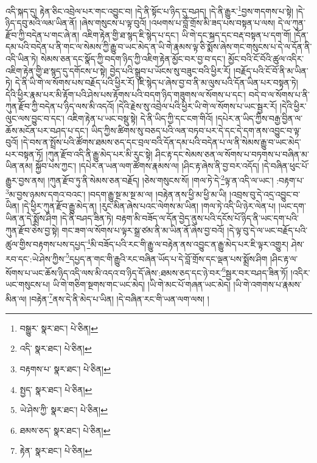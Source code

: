འདི་སྐད་དུ། རྟེན་ཅིང་འབྲེལ་པར་གང་འབྱུང་བ། །དེ་ནི་སྟོང་པ་ཉིད་དུ་བཤད། །དེ་ནི་རྒྱུར་\footnote{བསྒྱུར་  སྣར་ཐང་།  པེ་ཅིན། }བྱས་གདགས་པ་སྟེ། །དེ་ཉིད་དབུ་མའི་ལམ་ཡིན་ནོ། །ཞེས་གསུངས་པ་ལྟ་བུའོ། །འཕགས་པ་བློ་གྲོས་མི་ཟད་པས་བསྟན་པ་ལས། དེ་ལ་ཀུན་རྫོབ་ཀྱི་བདེན་པ་གང་ཞེ་ན། འཇིག་རྟེན་གྱི་ཐ་སྙད་ཇི་སྙེད་པ་དང་། ཡི་གེ་དང་སྐད་དང་བརྡ་བསྟན་པ་དག་གོ། །དོན་དམ་པའི་བདེན་པ་ནི་གང་ལ་སེམས་ཀྱི་རྒྱུ་བ་ཡང་མེད་ན་ཡི་གེ་རྣམས་ལྟ་ཅི་སྨོས་ཞེས་གང་གསུངས་པ་དེ་ལ་དོན་ནི་འདི་ཡིན་ཏེ། སེམས་ཅན་དང་སྣོད་ཀྱི་བདག་ཉིད་ཀྱི་འཇིག་རྟེན་མྱོང་བར་བྱ་བ་དང་། མྱོང་བའི་ངོ་བོའི་ཚུལ་འདིར་འཇིག་རྟེན་གྱི་ཐ་སྙད་དུ་དགོངས་པ་སྟེ། བྱེད་པའི་སྒྲུབ་པ་ཡོངས་སུ་བཟུང་བའི་ཕྱིར་རོ། །བརྗོད་པའི་ངོ་བོ་ནི་མ་ཡིན་ཏེ། དེ་ནི་ཡི་གེ་ལ་སོགས་པས་བརྗོད་པའི་ཕྱིར་རོ། །ཇི་སྙེད་པ་ཞེས་བྱ་བ་ནི་མ་ལུས་པའི་དོན་ཡིན་པར་བསྟན་ཏེ། དེའི་ཕྱིར་རྣམ་པར་མི་རྟོག་པའི་ཤེས་པས་རྟོགས་པའི་བདག་ཉིད་གཟུགས་ལ་སོགས་པ་དང་། བདེ་བ་ལ་སོགས་པ་ནི་ཀུན་རྫོབ་ཀྱི་བདེན་པ་ཉིད་ལས་མི་འདའོ། །དེའི་རྗེས་སུ་འབྲེལ་པའི་ཕྱིར་ཡི་གེ་ལ་སོགས་པ་ཡང་སྦྱར་རོ། །དེའི་ཕྱིར་ལུང་ལས་བྱུང་བ་དང་། འཇིག་རྟེན་པ་ཡང་བསྡུ་སྟེ། དེ་ནི་ཡིད་ཀྱི་དང་ངག་གིའོ། །དཔེར་ན་ཡིད་ཀྱིས་བརྒྱ་བྱིན་ལ་ཆོས་མངོན་པར་བཤད་པ་དང་། ཡིད་ཀྱིས་ཚིགས་སུ་བཅད་པའི་ལན་བཏབ་པར་དེ་དང་དེ་དག་ནས་འབྱུང་བ་ལྟ་བུའོ། །དེ་བས་ན་སྤྲོས་པའི་ཚོགས་ཐམས་ཅད་དང་བྲལ་བའི་དོན་དམ་པའི་བདེན་པ་ལ་ནི་སེམས་རྒྱུ་བ་ཡང་མེད་པར་བསྟན་ཏོ། །ཀུན་རྫོབ་འདི་ནི་རྒྱུ་མེད་པར་མི་རུང་སྟེ། ཤིང་རྟ་དང་སེམས་ཅན་ལ་སོགས་པ་བཏགས་པ་བཞིན་མ་ཡིན་ནམ། སྐྱོབ་པས་ཀྱང་། །དཔེར་ན་ཡན་ལག་ཚོགས་རྣམས་ལ། །ཤིང་རྟ་ཞེས་ནི་བྱ་བར་འདོད། །དེ་བཞིན་ཕུང་པོ་རྒྱུར་བྱས་ནས། །ཀུན་རྫོབ་ཏུ་ནི་སེམས་ཅན་བརྗོད། །ཅེས་གསུངས་སོ། །གལ་ཏེ་དེ་\footnote{འདི་  སྣར་ཐང་།  པེ་ཅིན། }ལྟ་ན་འདི་ལ་ཡང་། :བརྟག་པ་\footnote{བརྟགས་པ་  སྣར་ཐང་།  པེ་ཅིན། }མ་བྱས་ཉམས་དགའ་བའང་། །བདག་རྒྱུ་སྔ་མ་སྔ་མ་ལ། །བརྟེན་ནས་ཕྱི་མ་ཕྱི་མ་ཡི། །འབྲས་བུ་དེ་འདྲ་འབྱུང་བ་ཡིན། །དེ་ཕྱིར་ཀུན་རྫོབ་རྒྱུ་མེད་ན། །རུང་མིན་ཞེས་པའང་ལེགས་མ་ཡིན། །གལ་ཏེ་འདི་ཡི་ཉེར་ལེན་པ། །ཡང་དག་ཡིན་ན་དེ་སྨྲོས་ཤིག །དེ་ནི་བཤད་ཟིན་ཏེ། བརྟག་མི་བཟོད་ལ་དོན་བྱེད་ནུས་པའི་དངོས་པོ་ཉིད་ནི་ཡང་དག་པའི་ཀུན་རྫོབ་ཅེས་བྱ་སྟེ། གང་ཟག་ལ་སོགས་པ་ལྟར་སྒྲ་ཙམ་ནི་མ་ཡིན་ནོ་ཞེས་བྱ་བའོ། །དེ་ལྟ་བུ་དེ་ལ་ཡང་བརྗོད་པའི་ཚུལ་གྱིས་བརྟགས་པས་དཔྱད་\footnote{སྤྱད་  སྣར་ཐང་།  པེ་ཅིན། }མི་བཟོད་པའི་རང་གི་རྒྱུ་ལ་བརྟེན་ནས་འབྱུང་ན་རྒྱུ་མེད་པར་ཇི་ལྟར་འགྱུར། ཤེས་རབ་དང་:ཡེ་ཤེས་ཀྱིས་\footnote{ཡེ་ཤེས་ཀྱི་  སྣར་ཐང་།  པེ་ཅིན། }དཔྱད་ན་གང་གི་རྒྱུའི་རང་བཞིན་ཡོད་པ་དེ་བློ་གྲོས་དང་ལྡན་པས་སྨྲོས་ཤིག །ཤིང་རྟ་ལ་སོགས་པ་ཡང་ཆོས་ཉིད་འདི་ལས་མི་འདའ་བ་ཉིད་དོ་ཞེས་:ཐམས་ཅད་དང་ཉེ་བར་\footnote{ཐམས་ཅད་  སྣར་ཐང་།  པེ་ཅིན། }སྦྱར་བར་བཤད་ཟིན་ཏོ། །འདིར་ཡང་གསུངས་པ། ཡི་གེ་གཅིག་སྔགས་གང་ཡང་མེད། །ཡི་གེ་མང་པོ་གཞན་ཡང་མེད། །ཡི་གེ་འགགས་པ་རྣམས་མིན་ལ། །བརྟེན་\footnote{རྟེན་  སྣར་ཐང་།  པེ་ཅིན། }ནས་དེ་ནི་མེད་པ་ཡིན། །དེ་བཞིན་རང་གི་ཡན་ལག་ལས། །
